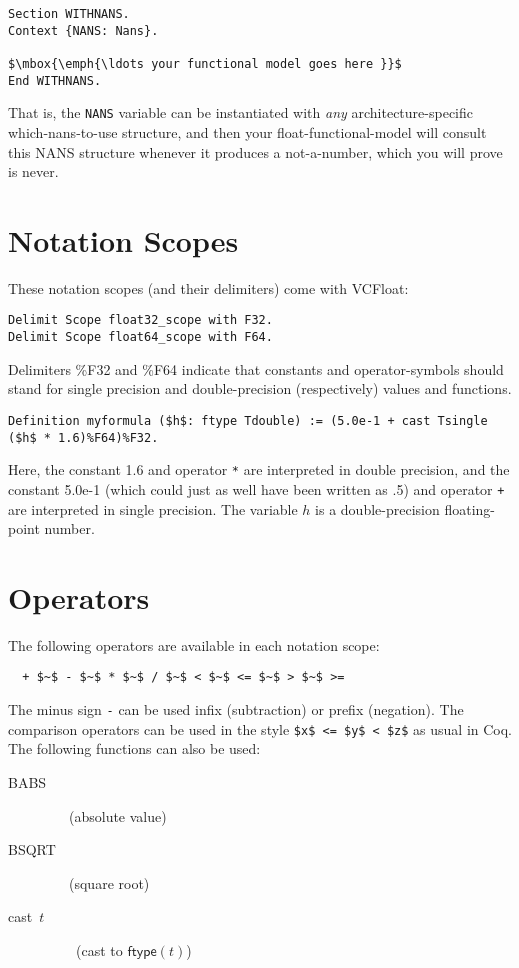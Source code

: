 \documentclass[article]{memoir}
\begin{document}
\begin{lstlisting}
Section WITHNANS.
Context {NANS: Nans}.

$\mbox{\emph{\ldots your functional model goes here }}$
End WITHNANS.
\end{lstlisting}
That is, the \lstinline{NANS} variable can be instantiated with
\emph{any} architecture-specific which-nans-to-use structure,
and then your float-functional-model will consult this NANS
structure whenever it produces a not-a-number, which you will prove
is never.

\chapter{Notation Scopes}
These notation scopes (and their delimiters) come with VCFloat:
\begin{lstlisting}
Delimit Scope float32_scope with F32.
Delimit Scope float64_scope with F64.
\end{lstlisting}

Delimiters \%F32 and \%F64 indicate that constants and operator-symbols should stand for single precision and double-precision (respectively) values and functions.
\begin{lstlisting}
Definition myformula ($h$: ftype Tdouble) := (5.0e-1 + cast Tsingle ($h$ * 1.6)%F64)%F32.
\end{lstlisting}
Here, the constant 1.6 and operator \lstinline{*} are
interpreted in double precision,
and the constant 5.0e-1 (which could just as well have been written
as .5) and operator \lstinline{+} are interpreted in single precision.
The variable $h$ is a double-precision floating-point number.

\chapter{Operators}
The following operators are available in each notation scope:
\begin{lstlisting}
  + $~$ - $~$ * $~$ / $~$ < $~$ <= $~$ > $~$ >= 
\end{lstlisting}
The minus sign \lstinline{-} can be used infix (subtraction) or prefix (negation).  The comparison operators can be used in the style
\lstinline{$x$ <= $y$ < $z$} as usual in Coq.
The following functions can also be used:
\begin{description}
\item[\textsf{BABS}]  ~~~(absolute value)
\item[\textsf{BSQRT}]  ~~~(square root)
\item[\textsf{cast~$t$}]  ~~~~(cast to $\mathsf{ftype}(t)$)
\end{description}
\end{document}
